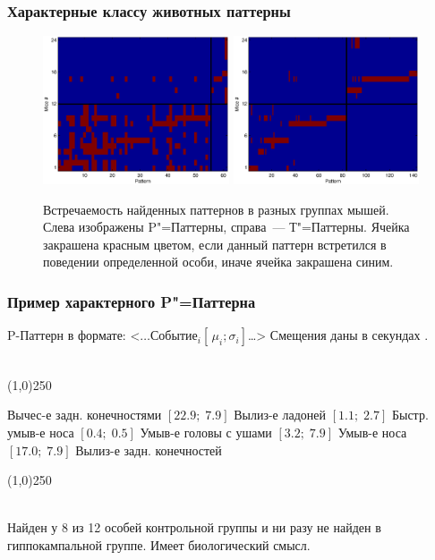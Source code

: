 \documentclass[smaller]{beamer}
\begin{document}
\begin{frame}
  \frametitle{Характерные классу животных паттерны}

\begin{figure}[H]
\noindent
	\begin{multicols}{2}
	\hfill
  \noindent
	\includegraphics[width=55mm]{char_pat.eps}
\vfill\hfill
	\includegraphics[width=55mm]{char_tpat.eps}
	\end{multicols}
	\caption{Встречаемость найденных паттернов в разных группах мышей. Слева изображены P"=Паттерны, справа~--- Т"=Паттерны. Ячейка закрашена красным цветом,
если данный паттерн встретился в поведении определенной особи, иначе ячейка закрашена синим.}
\end{figure}
\end{frame}

\begin{frame}
  \frametitle{Пример характерного P"=Паттерна}
P-Паттерн в формате: <$\dots\text{Событие}_i[\,\mu_i; \sigma_i]$\dots> \quad Смещения даны в секундах .
\\ ~\\ \begin{center}
\line(1,0){250}
\end{center}
 Вычес-е задн. конечностями $[22.9;\; 7.9]$
 Вылиз-е ладоней $[1.1;\; 2.7]$
 Быстр. умыв-е носа $[0.4;\; 0.5]$
 Умыв-е головы с ушами $[ 3.2;\; 7.9 ]$
 Умыв-е носа $[ 17.0;\; 7.9 ]$
 Вылиз-е задн. конечностей
 \\ \begin{center}
\line(1,0){250}
\end{center} ~\\

 Найден у 8 из 12 особей контрольной группы и ни разу не найден в гиппокампальной группе. Имеет биологический смысл.
\end{frame}
\end{document}
